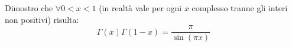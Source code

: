 \begin{theorem}
\label{Riflessione}
Dimostro che $\forall 0<x<1$ (in realtà vale per ogni $x$ complesso tranne gli interi non positivi) risulta:
\begin{equation}
	\Gamma(x)\Gamma(1-x)=\frac{\pi}{\sin(\pi x)}
\end{equation}

\end{theorem}